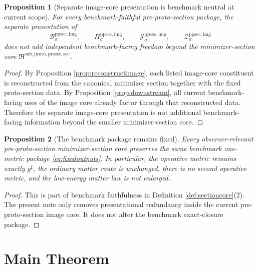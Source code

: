 \documentclass[11pt]{article}
\newcommand{\CompletedMetric}{g^{\sharp}}
\newcommand{\PreProtoSectionImgBody}[1]{\mathcal B_{#1}^{\mathrm{ppsec,img}}}
\newcommand{\PreProtoSectionImgProj}[1]{\Pi_{#1}^{\mathrm{ppsec,img}}}
\newcommand{\PreProtoSectionImgFunctional}[1]{\mathscr J_{#1}^{\mathrm{ppsec,img}}}
\newcommand{\PreProtoSectionImgShell}[1]{\mathcal Z_{#1}^{\mathrm{ppsec,img}}}
\newcommand{\PreProtoSectionMinSectionCore}{\mathfrak R^{\mathrm{sub,proto,presec,sec}}}
\newtheorem{proposition}{Proposition}
\begin{document}
\begin{proposition}[Separate image-core presentation is benchmark neutral at current scope]
\label{prop:neutral}
For every benchmark-faithful pre-proto-section package, the separate presentation of
\[
\PreProtoSectionImgBody{\sigma},
\qquad
\PreProtoSectionImgProj{\sigma},
\qquad
\PreProtoSectionImgFunctional{\sigma},
\qquad
\PreProtoSectionImgShell{\sigma}
\]
does not add independent benchmark-facing freedom beyond the minimizer-section core \(\PreProtoSectionMinSectionCore\).
\end{proposition}

\begin{proof}
By Proposition \ref{prop:reconstructimage}, each listed image-core constituent is reconstructed from the canonical minimizer section together with the fixed proto-section data. By Proposition \ref{prop:downstream}, all current benchmark-facing uses of the image core already factor through that reconstructed data. Therefore the separate image-core presentation is not additional benchmark-facing information beyond the smaller minimizer-section core.
\end{proof}

\begin{proposition}[The benchmark package remains fixed]
\label{prop:benchmark}
Every observer-relevant pre-proto-section minimizer-section core preserves the same benchmark one-metric package \eqref{eq:fixedoutputs}. In particular, the operative metric remains exactly \(\CompletedMetric\), the ordinary matter route is unchanged, there is no second operative metric, and the low-energy matter law is not enlarged.
\end{proposition}

\begin{proof}
This is part of benchmark faithfulness in Definition \ref{def:sectioncore}(2). The present note only removes presentational redundancy inside the current pre-proto-section image core. It does not alter the benchmark exact-closure package.
\end{proof}

\section{Main Theorem}
\end{document}

